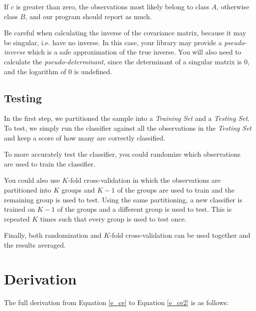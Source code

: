 \documentclass{article}
\begin{document}
If $c$ is greater than zero, the observations most likely belong
to class $A$, otherwise class $B$, and our program should report as much.

\begin{note}
Be careful when calculating the inverse of the covariance matrix,
because it may be singular, i.e. have no inverse.  In this case, your
library may provide a \emph{pseudo-inverse}\cite{wiki_pinv} which is
a safe approximation of the true inverse. You will also need to calculate the
\emph{pseudo-determinant}\cite{wiki_pdet}, since the determinant of a singular
matrix is $0$, and the logarithm of $0$ is undefined.
\end{note}

\subsection{Testing}
\label{ss_testing}

In the first step, we partitioned the sample into a \emph{Training
  Set} and a \emph{Testing Set}.  To test, we simply run the
  classifier against all the observations in the \emph{Testing Set}
  and keep a score of how many are correctly classified.

To more accurately test the classifier, you could randomize which
observations are used to train the classifier.

You could also use $K$-fold cross-validation in which the observations
are partitioned into $K$ groups and $K-1$ of the groups are used to
train and the remaining group is used to test.  Using the same
partitioning, a new classifier is trained on $K-1$ of the groups and a
different group is used to test.  This is repeated $K$ times such that
every group is used to test once.

Finally, both randomization and $K$-fold cross-validation can be used
together and the results averaged.

\appendix
\section{Derivation}
\label{app:derivation}

The full derivation from Equation \ref{e_ce} to Equation \ref{e_ce2} is
as follows:
\end{document}
